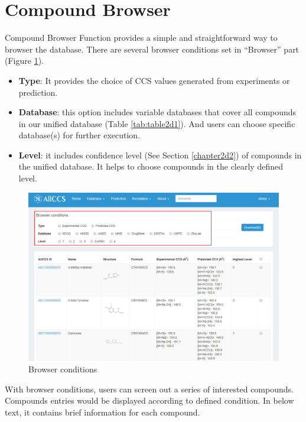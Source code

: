 \documentclass[12pt,]{book}
\providecommand{\tightlist}{%
  \setlength{\itemsep}{0pt}\setlength{\parskip}{0pt}}
\theoremstyle{definition}
\theoremstyle{definition}
\theoremstyle{definition}
\theoremstyle{remark}
\begin{document}
\section{Compound Browser}\label{chapter2d1}

Compound Browser Function provides a simple and straightforward way to
browser the database. There are several browser conditions set in
``Browser'' part (Figure \ref{fig:figure2d1}).

\begin{itemize}
\tightlist
\item
  \textbf{Type}: It provides the choice of CCS values generated from
  experiments or prediction.
\item
  \textbf{Database}: this option includes variable databases that cover
  all compounds in our unified database (Table \ref{tab:table2d1}). And
  users can choose specific database(s) for further execution.
\item
  \textbf{Level}: it includes confidence level (See Section
  \ref{chapter2d2}) of compounds in the unified database. It helps to
  choose compounds in the clearly defined level.
\end{itemize}

\begin{figure}

{\centering \includegraphics{images/chapter2/figure2.1browser_condition} 

}

\caption{Browser conditions}\label{fig:figure2d1}
\end{figure}

With browser conditions, users can screen out a series of interested
compounds. Compounds entries would be displayed according to defined
condition. In below text, it contains brief information for each
compound.
\end{document}
